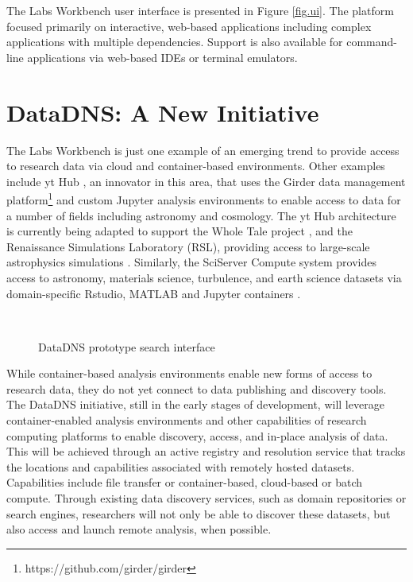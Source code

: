 \documentclass{sig-alternate}
\begin{document}
The Labs Workbench user interface is presented in Figure \ref{fig.ui}.  The platform focused primarily on interactive, web-based applications including complex applications with multiple dependencies. Support is also available for command-line applications via web-based IDEs or terminal emulators.  

\section{DataDNS: A New Initiative}

The Labs Workbench is just one example of an emerging trend to provide access to research data via cloud and container-based environments.  Other examples include yt Hub \cite{zuhone2016galaxy}, an innovator in this area, that uses the Girder data management platform\footnote{https://github.com/girder/girder} and custom Jupyter analysis environments to enable access to data for a number of fields including astronomy and cosmology. The yt Hub architecture is currently being adapted to support the Whole Tale project \cite{ludaescher2016capturing}, and the Renaissance Simulations Laboratory (RSL), providing access to large-scale astrophysics simulations \cite{2041-8205-807-1-L12}.  Similarly, the SciServer Compute system provides access to astronomy, materials science, turbulence, and earth science datasets via domain-specific Rstudio, MATLAB and Jupyter containers \cite{Medvedev:2016:SCB:2949689.2949700}.  

\begin{figure}[!ht]
\\
\caption{DataDNS prototype search interface}
\label{fig.datadns}
\end{figure}

While container-based analysis environments enable new forms of access to research data, they do not yet connect to data publishing and discovery tools.  The DataDNS initiative, still in the early stages of development, will leverage container-enabled analysis environments and other capabilities of research computing platforms to enable discovery, access, and in-place analysis of data.  This will be achieved through an active registry and resolution service that tracks the locations and capabilities associated with remotely hosted datasets. Capabilities include file transfer or container-based, cloud-based or batch compute. Through existing data discovery services, such as domain repositories or search engines, researchers will not only be able to discover these datasets, but also access and launch remote analysis, when possible.   
\end{document}
